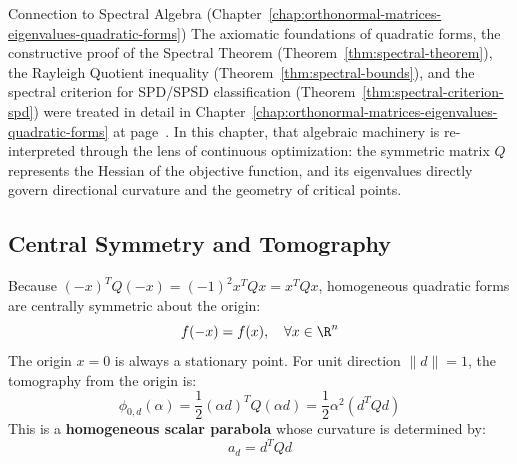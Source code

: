 \begin{noteblock}{Connection to Spectral Algebra (Chapter~\ref{chap:orthonormal-matrices-eigenvalues-quadratic-forms})}
The axiomatic foundations of quadratic forms, the constructive proof of the Spectral Theorem (Theorem~\ref{thm:spectral-theorem}), the Rayleigh Quotient inequality (Theorem~\ref{thm:spectral-bounds}), and the spectral criterion for SPD/SPSD classification (Theorem~\ref{thm:spectral-criterion-spd}) were treated in detail in Chapter~\ref{chap:orthonormal-matrices-eigenvalues-quadratic-forms} at page~\pageref{sec:en:spd-spsd-matrices}.
In this chapter, that algebraic machinery is re-interpreted through the lens of continuous optimization: the symmetric matrix $Q$ represents the Hessian of the objective function, and its eigenvalues directly govern directional curvature and the geometry of critical points.
\end{noteblock}

\subsection{Central Symmetry and Tomography}
Because $(-x)^T Q (-x) = (-1)^2 x^T Q x = x^T Q x$, homogeneous quadratic forms are centrally symmetric about the origin:
\begin{equation}
f(-x) = f(x), \quad \forall x \in \R^n
\end{equation}
The origin $x = 0$ is always a stationary point. For unit direction $\|d\| = 1$, the tomography from the origin is:
\begin{equation}
\phi_{0, d}(\alpha) = \frac{1}{2} (\alpha d)^T Q (\alpha d) = \frac{1}{2} \alpha^2 (d^T Q d)
\end{equation}
This is a \textbf{homogeneous scalar parabola} whose curvature is determined by:
\begin{equation}
a_d = d^T Q d
\end{equation}

